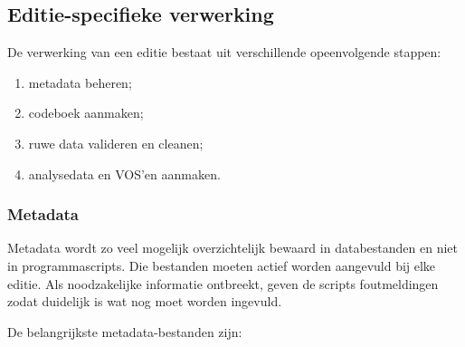 \documentclass{VSAnote}
\begin{document}
\subsection{Editie-specifieke verwerking}

De verwerking van een editie bestaat uit verschillende opeenvolgende stappen:
\begin{enumerate}[nosep]
\item metadata beheren;
\item codeboek aanmaken;
\item ruwe data valideren en cleanen;
\item analysedata en VOS'en aanmaken.
\end{enumerate}


\subsubsection{Metadata}

Metadata wordt zo veel mogelijk overzichtelijk bewaard in databestanden en niet in programmascripts. Die bestanden moeten actief worden aangevuld bij elke editie. Als noodzakelijke informatie ontbreekt, geven de scripts foutmeldingen zodat duidelijk is wat nog moet worden ingevuld.

De belangrijkste metadata-bestanden zijn:
\end{document}
